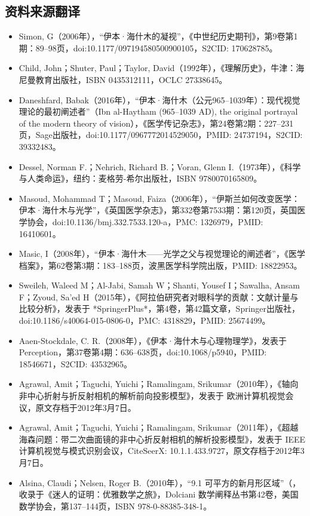 \subsection{资料来源翻译}
\begin{itemize}
\item Simon, G（2006年），“伊本·海什木的凝视”，《中世纪历史期刊》，第9卷第1期：89–98页，doi:10.1177/097194580500900105，S2CID: 170628785。
\item Child, John；Shuter, Paul；Taylor, David（1992年），《理解历史》，牛津：海尼曼教育出版社，ISBN 0435312111，OCLC 27338645。
\item Daneshfard, Babak（2016年），“伊本·海什木（公元965–1039年）：现代视觉理论的最初阐述者”（Ibn al-Haytham (965–1039 AD), the original portrayal of the modern theory of vision），《医学传记杂志》，第24卷第2期：227–231页，Sage出版社，doi:10.1177/0967772014529050，PMID: 24737194，S2CID: 39332483。
\item Dessel, Norman F.；Nehrich, Richard B.；Voran, Glenn I.（1973年），《科学与人类命运》，纽约：麦格劳-希尔出版社，ISBN 9780070165809。
\item Masoud, Mohammad T；Masoud, Faiza（2006年），“伊斯兰如何改变医学：伊本·海什木与光学”，《英国医学杂志》，第332卷第7533期：第120页，英国医学协会，doi:10.1136/bmj.332.7533.120-a，PMC: 1326979，PMID: 16410601。
\item Masic, I（2008年），“伊本·海什木——光学之父与视觉理论的阐述者”，《医学档案》，第62卷第3期：183–188页，波黑医学科学院出版，PMID: 18822953。
\item Sweileh, Waleed M；Al-Jabi, Samah W；Shanti, Yousef I；Sawalha, Ansam F；Zyoud, Sa'ed H（2015年），《阿拉伯研究者对眼科学的贡献：文献计量与比较分析》，发表于 *SpringerPlus*，第4卷，第42篇文章，Springer出版社，doi:10.1186/s40064-015-0806-0，PMC: 4318829，PMID: 25674499。
\item Aaen-Stockdale, C. R.（2008年），《伊本·海什木与心理物理学》，发表于 Perception，第37卷第4期：636–638页，doi:10.1068/p5940，PMID: 18546671，S2CID: 43532965。
\item Agrawal, Amit；Taguchi, Yuichi；Ramalingam, Srikumar（2010年），《轴向非中心折射与折反射相机的解析前向投影模型》，发表于 欧洲计算机视觉会议，原文存档于2012年3月7日。
\item Agrawal, Amit；Taguchi, Yuichi；Ramalingam, Srikumar（2011年），《超越海森问题：带二次曲面镜的非中心折反射相机的解析投影模型》，发表于 IEEE计算机视觉与模式识别会议，CiteSeerX: 10.1.1.433.9727，原文存档于2012年3月7日。
\item Alsina, Claudi；Nelsen, Roger B.（2010年），“9.1 可平方的新月形区域”（，收录于《迷人的证明：优雅数学之旅》，Dolciani 数学阐释丛书第42卷，美国数学协会，第137–144页，ISBN 978-0-88385-348-1。

\end{itemize}
